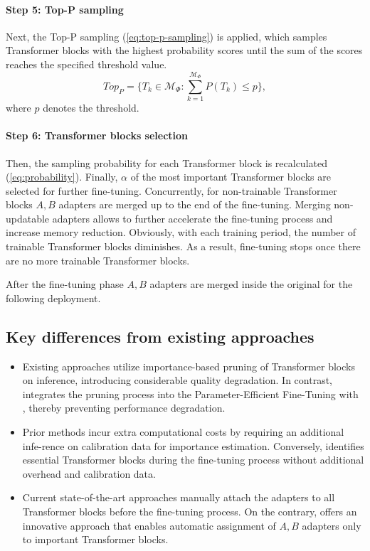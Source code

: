             \paragraph{Step 5: Top-P sampling} Next, the Top-P sampling (\ref{eq:top-p-sampling}) is applied, which samples Transformer blocks with the highest probability scores until the sum of the scores reaches the specified threshold value. 
            \begin{equation}\label{eq:top-p-sampling}
                Top_P = \{T_k \in \mathcal{M}_\Phi : \sum_{k=1}^{\mathcal{M}_\Phi}P(T_k)\le p\},
            \end{equation}
            where \(p\) denotes the threshold.
            \paragraph{Step 6: Transformer blocks selection} Then, the sampling probability for each Transformer block is recalculated (\ref{eq:probability}). Finally, \(\alpha\) of the most important Transformer blocks are selected for further fine-tuning. 
    Concurrently, for non-trainable Transformer blocks \lora{} \(A, B\) adapters are merged up to the end of the fine-tuning. Merging non-updatable adapters allows to further accelerate the fine-tuning process and increase memory reduction. Obviously, with each training period, the number of trainable Transformer blocks diminishes. As a result, fine-tuning stops once there are no more trainable Transformer blocks. 

    After the fine-tuning phase \lora{} \(A, B\) adapters are merged inside the original \llm{} for the following deployment. 

    \subsection{Key differences from existing approaches}
        \begin{itemize}
            \item Existing approaches utilize importance-based pruning of Transformer blocks on inference, introducing considerable quality degradation. In contrast, \ourmethodshort{} integrates the pruning process into the Parameter-Efficient Fine-Tuning with \lora{}, thereby preventing performance degradation.
            \item Prior methods incur extra computational costs by requiring an additional infe-rence on calibration data for importance estimation. Conversely, \ourmethodshort{} identifies essential Transformer blocks during the fine-tuning process without additional overhead and calibration data. 
            \item Current state-of-the-art approaches manually attach the \lora{} adapters to all Transformer blocks before the fine-tuning process. On the contrary, \ourmethodshort{} offers an innovative approach that enables automatic assignment of \lora{} \(A, B\) adapters only to important Transformer blocks. 
        \end{itemize}
